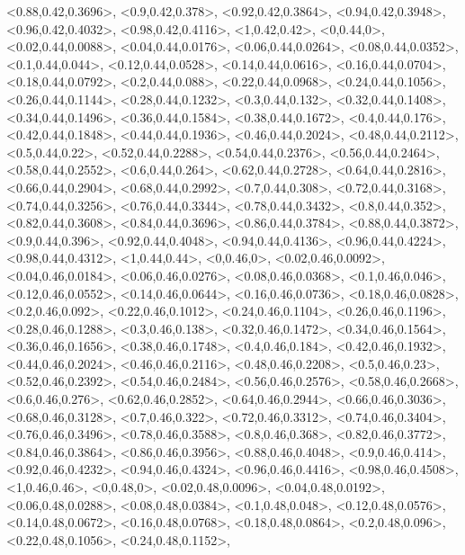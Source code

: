 \documentclass[a4paper,10pt]{article}
\begin{document}
\begin{eulernotebook}
\begin{euleroutput}
  <0.88,0.42,0.3696>,
  <0.9,0.42,0.378>,
  <0.92,0.42,0.3864>,
  <0.94,0.42,0.3948>,
  <0.96,0.42,0.4032>,
  <0.98,0.42,0.4116>,
  <1,0.42,0.42>,
  <0,0.44,0>,
  <0.02,0.44,0.0088>,
  <0.04,0.44,0.0176>,
  <0.06,0.44,0.0264>,
  <0.08,0.44,0.0352>,
  <0.1,0.44,0.044>,
  <0.12,0.44,0.0528>,
  <0.14,0.44,0.0616>,
  <0.16,0.44,0.0704>,
  <0.18,0.44,0.0792>,
  <0.2,0.44,0.088>,
  <0.22,0.44,0.0968>,
  <0.24,0.44,0.1056>,
  <0.26,0.44,0.1144>,
  <0.28,0.44,0.1232>,
  <0.3,0.44,0.132>,
  <0.32,0.44,0.1408>,
  <0.34,0.44,0.1496>,
  <0.36,0.44,0.1584>,
  <0.38,0.44,0.1672>,
  <0.4,0.44,0.176>,
  <0.42,0.44,0.1848>,
  <0.44,0.44,0.1936>,
  <0.46,0.44,0.2024>,
  <0.48,0.44,0.2112>,
  <0.5,0.44,0.22>,
  <0.52,0.44,0.2288>,
  <0.54,0.44,0.2376>,
  <0.56,0.44,0.2464>,
  <0.58,0.44,0.2552>,
  <0.6,0.44,0.264>,
  <0.62,0.44,0.2728>,
  <0.64,0.44,0.2816>,
  <0.66,0.44,0.2904>,
  <0.68,0.44,0.2992>,
  <0.7,0.44,0.308>,
  <0.72,0.44,0.3168>,
  <0.74,0.44,0.3256>,
  <0.76,0.44,0.3344>,
  <0.78,0.44,0.3432>,
  <0.8,0.44,0.352>,
  <0.82,0.44,0.3608>,
  <0.84,0.44,0.3696>,
  <0.86,0.44,0.3784>,
  <0.88,0.44,0.3872>,
  <0.9,0.44,0.396>,
  <0.92,0.44,0.4048>,
  <0.94,0.44,0.4136>,
  <0.96,0.44,0.4224>,
  <0.98,0.44,0.4312>,
  <1,0.44,0.44>,
  <0,0.46,0>,
  <0.02,0.46,0.0092>,
  <0.04,0.46,0.0184>,
  <0.06,0.46,0.0276>,
  <0.08,0.46,0.0368>,
  <0.1,0.46,0.046>,
  <0.12,0.46,0.0552>,
  <0.14,0.46,0.0644>,
  <0.16,0.46,0.0736>,
  <0.18,0.46,0.0828>,
  <0.2,0.46,0.092>,
  <0.22,0.46,0.1012>,
  <0.24,0.46,0.1104>,
  <0.26,0.46,0.1196>,
  <0.28,0.46,0.1288>,
  <0.3,0.46,0.138>,
  <0.32,0.46,0.1472>,
  <0.34,0.46,0.1564>,
  <0.36,0.46,0.1656>,
  <0.38,0.46,0.1748>,
  <0.4,0.46,0.184>,
  <0.42,0.46,0.1932>,
  <0.44,0.46,0.2024>,
  <0.46,0.46,0.2116>,
  <0.48,0.46,0.2208>,
  <0.5,0.46,0.23>,
  <0.52,0.46,0.2392>,
  <0.54,0.46,0.2484>,
  <0.56,0.46,0.2576>,
  <0.58,0.46,0.2668>,
  <0.6,0.46,0.276>,
  <0.62,0.46,0.2852>,
  <0.64,0.46,0.2944>,
  <0.66,0.46,0.3036>,
  <0.68,0.46,0.3128>,
  <0.7,0.46,0.322>,
  <0.72,0.46,0.3312>,
  <0.74,0.46,0.3404>,
  <0.76,0.46,0.3496>,
  <0.78,0.46,0.3588>,
  <0.8,0.46,0.368>,
  <0.82,0.46,0.3772>,
  <0.84,0.46,0.3864>,
  <0.86,0.46,0.3956>,
  <0.88,0.46,0.4048>,
  <0.9,0.46,0.414>,
  <0.92,0.46,0.4232>,
  <0.94,0.46,0.4324>,
  <0.96,0.46,0.4416>,
  <0.98,0.46,0.4508>,
  <1,0.46,0.46>,
  <0,0.48,0>,
  <0.02,0.48,0.0096>,
  <0.04,0.48,0.0192>,
  <0.06,0.48,0.0288>,
  <0.08,0.48,0.0384>,
  <0.1,0.48,0.048>,
  <0.12,0.48,0.0576>,
  <0.14,0.48,0.0672>,
  <0.16,0.48,0.0768>,
  <0.18,0.48,0.0864>,
  <0.2,0.48,0.096>,
  <0.22,0.48,0.1056>,
  <0.24,0.48,0.1152>,

\end{euleroutput}
\end{eulernotebook}
\end{document}

